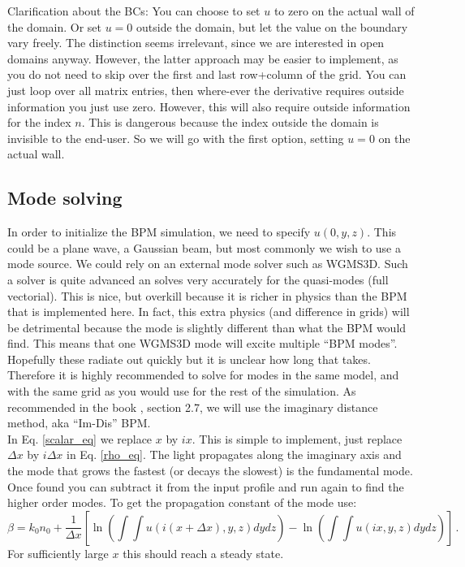 \documentclass[]{article}
\begin{document}
	
	Clarification about the BCs: You can choose to set $u$ to zero on the actual wall of the domain. Or set $u=0$ outside the domain, but let the value on the boundary vary freely. The distinction seems irrelevant, since we are interested in open domains anyway. However, the latter approach may be easier to implement, as you do not need to skip over the first and last row+column of the grid. You can just loop over all matrix entries, then where-ever the derivative requires outside information you just use zero. However, this will also require outside information for the index $n$. This is dangerous because the index outside the domain is invisible to the end-user. So we will go with the first option, setting $u=0$ on the actual wall.
	
	\subsection{Mode solving}
	In order to initialize the BPM simulation, we need to specify $u(0,y,z)$. This could be a plane wave, a Gaussian beam, but most commonly we wish to use a mode source. We could rely on an external mode solver such as WGMS3D. Such a solver is quite advanced an solves very accurately for the quasi-modes (full vectorial). This is nice, but overkill because it is richer in physics than the BPM that is implemented here. In fact, this extra physics (and difference in grids) will be detrimental because the mode is slightly different than what the BPM would find. This means that one WGMS3D mode will excite multiple ``BPM modes''. Hopefully these radiate out quickly but it is unclear how long that takes. Therefore it is highly recommended to solve for modes in the same model, and with the same grid as you would use for the rest of the simulation. As recommended in the book \cite{Lifante_2015}, section 2.7, we will use the imaginary distance method, aka ``Im-Dis'' BPM.\\
	
	In Eq. \eqref{scalar_eq} we replace $x$ by $ix$. This is simple to implement, just replace $\Delta x$ by $i \Delta x$ in Eq. \eqref{rho_eq}. The light propagates along the imaginary axis and the mode that grows the fastest (or decays the slowest) is the fundamental mode. Once found you can subtract it from the input profile and run again to find the higher order modes. To get the propagation constant of the mode use:
	\begin{equation}
		\beta = k_0 n_0 + \frac{1}{\Delta x}\left[\ln\left( \int \int u(i(x+\Delta x),y,z)  dy dz \right) -\ln\left( \int \int u(ix,y,z)  dy dz \right)  \right] \, .
	\end{equation}
	For sufficiently large $x$ this should reach a steady state.
	
	

	
	
	
	
\end{document}
